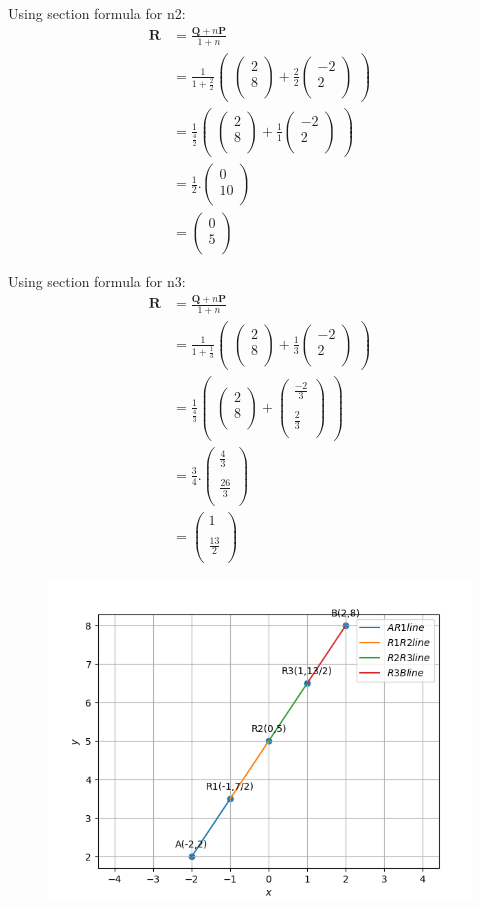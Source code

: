 \documentclass[12pt]{article}
\newcommand{\myvec}[1]{\ensuremath{\begin{pmatrix}#1\end{pmatrix}}}
\let\vec\mathbf
\begin{document}
Using section formula for n2:
\begin{align}
\vec{R}&=\frac{\vec{Q}+n\vec{P}}{1+n}\\
&=\frac{1}{1+\frac{2}{2}}  \myvec{\myvec{
2\\
8\\
}
  +
   \frac{2}{2}\myvec{
-2\\
2\\
}}\\
&= \frac{1}{\frac{4}{2}} \myvec{\myvec{
2\\
8\\
}
  +
\frac{1}{1}\myvec{
-2\\
2\\
}} \\
&=\frac{1}{2}.
\myvec{
0\\
10\\
}\\
&=\myvec{
0\\
5\\
}
\end{align}

Using section formula for n3:
\begin{align}
\vec{R}&=\frac{\vec{Q}+n\vec{P}}{1+n}\\
&=\frac{1}{1+\frac{1}{3}}  \myvec{\myvec{
2\\
8\\
}
  +
   \frac{1}{3}\myvec{
-2\\
2\\
}}\\
&= \frac{1}{\frac{4}{3}} \myvec{\myvec{
2\\
8\\
}
  +
\myvec{
\frac{-2}{3}\\
\\
\frac{2}{3}\\
}} \\
&=\frac{3}{4}.
\myvec{
\frac{4}{3}\\
\\
\frac{26}{3}\\
}\\
&=\myvec{
1\\
\\
\frac{13}{2}\\
}
\end{align}

\begin{figure}[!h]
\begin{center}
   \includegraphics[width=\columnwidth]{./pics/7.2.9.png}
\end{center}
\caption{}
\label{fig:Fig}
\end{figure}
\end{document}
